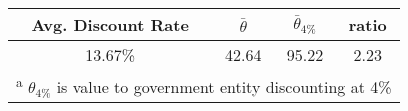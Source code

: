 \documentclass[border=1mm, preview]{standalone}
\begin{document}
\begin{tabular}{c|c|c|c}
\hline
Avg. Discount Rate & $\bar{\theta}$ & $\bar{\theta}_{4\%}$ & ratio\\
\hline
\hline
13.67\% & 42.64 & 95.22 & 2.23\\
\hline
\multicolumn{4}{l}{\textsuperscript{a} $\theta_{4\%}$ is value to government entity discounting at 4\%}\\
\end{tabular}
\end{document}
